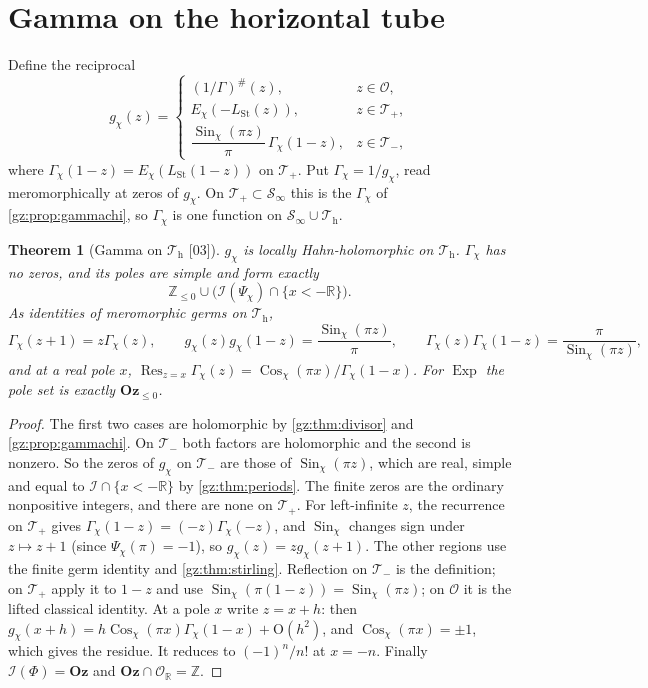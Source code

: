 \documentclass[11pt,a4paper]{article}
\numberwithin{equation}{section}
\newtheorem{theorem}{Theorem}[section]
\theoremstyle{definition}
\theoremstyle{remark}
\newcommand{\Oz}{\mathbf{Oz}}
\newcommand{\R}{\mathbb R}
\newcommand{\Z}{\mathbb Z}
\newcommand{\OO}{\mathcal O}
\newcommand{\Res}{\operatorname{Res}}
\newcommand{\Exp}{\operatorname{Exp}}
\newcommand{\Sin}{\operatorname{Sin}}
\newcommand{\Cos}{\operatorname{Cos}}
\newcommand{\cI}{\mathcal I}
\newcommand{\LSt}{L_{\mathrm{St}}}
\newcommand{\Tp}{\mathcal T_{+}}
\newcommand{\Tm}{\mathcal T_{-}}
\newcommand{\Th}{\mathcal T_{\mathrm h}}
\newcommand{\Sinf}{\mathcal S_{\infty}}
\newcommand{\src}[1]{\textup{[#1]}}
\newcommand{\bigO}{\mathrm{O}}
\begin{document}
\section{Gamma on the horizontal tube}\label{gz:sec:gammatube}
Define the reciprocal
\[
g_\chi(z)=\begin{cases}(1/\Gamma)^\#(z),&z\in\OO,\\ E_\chi(-\LSt(z)),&z\in\Tp,\\ \dfrac{\Sin_\chi(\pi z)}\pi\,\Gamma_\chi(1-z),&z\in\Tm,\end{cases}
\]
where $\Gamma_\chi(1-z)=E_\chi(\LSt(1-z))$ on $\Tp$. Put $\Gamma_\chi=1/g_\chi$,
read meromorphically at zeros of $g_\chi$. On $\Tp\subset\Sinf$ this is
the $\Gamma_\chi$ of \cref{gz:prop:gammachi}, so $\Gamma_\chi$ is one function
on $\Sinf\cup\Th$.

\begin{theorem}[Gamma on $\Th$ \src{03}]\label{gz:thm:gamma-tube}
$g_\chi$ is locally Hahn-holomorphic on $\Th$. $\Gamma_\chi$ has no zeros,
and its poles are simple and form exactly
\[
\Z_{\le0}\cup\bigl(\cI(\Psi_\chi)\cap\{x<-\R\}\bigr).
\]
As identities of meromorphic germs on $\Th$,
\[
\Gamma_\chi(z+1)=z\Gamma_\chi(z),\qquad g_\chi(z)g_\chi(1-z)=\frac{\Sin_\chi(\pi z)}\pi,\qquad
\Gamma_\chi(z)\Gamma_\chi(1-z)=\frac\pi{\Sin_\chi(\pi z)},
\]
and at a real pole $x$, $\Res_{z=x}\Gamma_\chi(z)=\Cos_\chi(\pi x)/\Gamma_\chi(1-x)$.
For $\Exp$ the pole set is exactly $\Oz_{\le0}$.
\end{theorem}
\begin{proof}
The first two cases are holomorphic by \cref{gz:thm:divisor} and
\cref{gz:prop:gammachi}. On $\Tm$ both factors are holomorphic and the second
is nonzero. So the zeros of $g_\chi$ on $\Tm$ are those of $\Sin_\chi(\pi z)$,
which are real, simple and equal to $\cI\cap\{x<-\R\}$ by
\cref{gz:thm:periods}. The finite zeros are the ordinary nonpositive
integers, and there are none on $\Tp$. For left-infinite $z$, the recurrence
on $\Tp$ gives $\Gamma_\chi(1-z)=(-z)\Gamma_\chi(-z)$, and $\Sin_\chi$ changes
sign under $z\mapsto z+1$ (since $\Psi_\chi(\pi)=-1$), so $g_\chi(z)=zg_\chi(z+1)$.
The other regions use the finite germ identity and \cref{gz:thm:stirling}.
Reflection on $\Tm$ is the definition; on $\Tp$ apply it to $1-z$ and use
$\Sin_\chi(\pi(1-z))=\Sin_\chi(\pi z)$; on $\OO$ it is the lifted classical
identity. At a pole $x$ write $z=x+h$: then
$g_\chi(x+h)=h\Cos_\chi(\pi x)\Gamma_\chi(1-x)+\bigO(h^2)$, and
$\Cos_\chi(\pi x)=\pm1$, which gives the residue. It reduces to $(-1)^n/n!$ at
$x=-n$. Finally $\cI(\Phi)=\Oz$ and $\Oz\cap\OO_\R=\Z$.
\end{proof}
\end{document}
